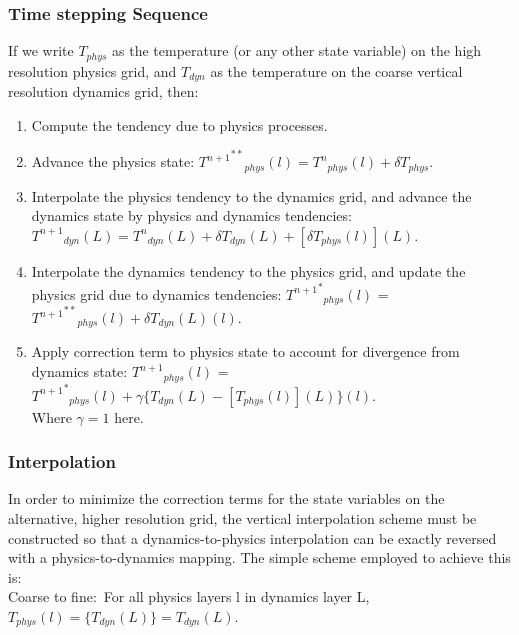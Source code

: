 \subsubsection{Time stepping Sequence}
If we write $T_{phys}$ as the temperature (or any other state variable) on the high
resolution physics grid, and $T_{dyn}$ as the temperature on the coarse vertical resolution
dynamics grid, then:

\begin{enumerate}

\item{Compute the tendency due to physics processes.}

\item{Advance the physics state: ${{T^{n+1}}^{**}}_{phys}(l) = {T^n}_{phys}(l) + \delta T_{phys}$.}

\item{Interpolate the physics tendency to the dynamics grid, and advance the dynamics
state by physics and dynamics tendencies:
${T^{n+1}}_{dyn}(L) = {T^n}_{dyn}(L) + \delta T_{dyn}(L) + [\delta T _{phys}(l)](L)$.}

\item{Interpolate the dynamics tendency to the physics grid, and update the physics
grid due to dynamics tendencies: 
${{T^{n+1}}^*}_{phys}(l)$ = ${{T^{n+1}}^{**}}_{phys}(l) + {\delta T_{dyn}(L)}(l)$.}

\item{Apply correction term to physics state to account for divergence from dynamics state:
${T^{n+1}}_{phys}(l)$ = ${{T^{n+1}}^*}_{phys}(l) + \gamma \{  T_{dyn}(L) - [T_{phys}(l)](L) \}(l)$.} \\
Where $\gamma=1$ here. 

\end{enumerate}

\subsubsection{Interpolation}
In order to minimize the correction terms for the state variables on the alternative,
higher resolution grid, the vertical interpolation scheme must be constructed so that
a dynamics-to-physics interpolation can be exactly reversed with a physics-to-dynamics mapping.
The simple scheme employed to achieve this is:\\

Coarse to fine:\
For all physics layers l in dynamics layer L, $ T_{phys}(l) = \{T_{dyn}(L)\} = T_{dyn}(L) $.

